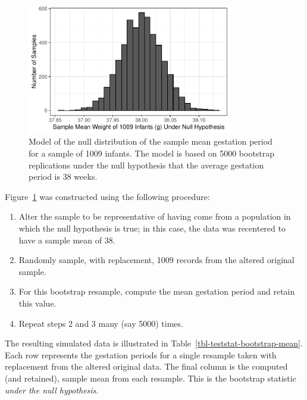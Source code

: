\documentclass[
  letterpaper,
  DIV=11,
  numbers=noendperiod]{scrreprt}
\providecommand{\tightlist}{%
  \setlength{\itemsep}{0pt}\setlength{\parskip}{0pt}}\usepackage{longtable,booktabs,array}
\theoremstyle{plain}
\theoremstyle{definition}
\theoremstyle{definition}
\theoremstyle{remark}
\begin{document}
\begin{figure}

{\centering \includegraphics[width=0.8\textwidth,height=\textheight]{./images/fig-teststat-null-mean-1.pdf}

}

\caption{\label{fig-teststat-null-mean}Model of the null distribution of
the sample mean gestation period for a sample of 1009 infants. The model
is based on 5000 bootstrap replications under the null hypothesis that
the average gestation period is 38 weeks.}

\end{figure}

Figure~\ref{fig-teststat-null-mean} was constructed using the following
procedure:

\begin{enumerate}
\def\labelenumi{\arabic{enumi}.}
\tightlist
\item
  Alter the sample to be representative of having come from a population
  in which the null hypothesis is true; in this case, the data was
  recentered to have a sample mean of 38.
\item
  Randomly sample, with replacement, 1009 records from the altered
  original sample.
\item
  For this bootstrap resample, compute the mean gestation period and
  retain this value.
\item
  Repeat steps 2 and 3 many (say 5000) times.
\end{enumerate}

The resulting simulated data is illustrated in
Table~\ref{tbl-teststat-bootstrap-mean}. Each row represents the
gestation periods for a single resample taken with replacement from the
altered original data. The final column is the computed (and retained),
sample mean from each resample. This is the bootstrap statistic
\emph{under the null hypothesis}.
\end{document}
